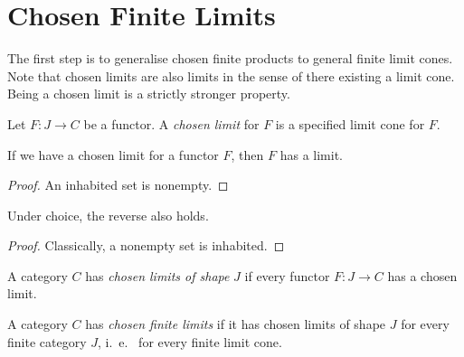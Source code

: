 \section{Chosen Finite Limits}

The first step is to generalise chosen finite products to general finite limit cones. Note that chosen limits are also limits in the sense of there existing a limit cone. Being a chosen limit is a strictly stronger property.

\begin{definition}
  \label{def:chosen-limit}
  \leanok
  Let $F : J \to C$ be a functor. A \emph{chosen limit} for $F$ is a specified limit cone for $F$.
\end{definition}

\begin{proposition}
  \label{prop:chosen-limit-implies-limit}
  \leanok
  If we have a chosen limit for a functor $F$, then $F$ has a limit.
\end{proposition}

\begin{proof}
  \leanok
  An inhabited set is nonempty.
\end{proof}

Under choice, the reverse also holds. 

\begin{proposition}
  \label{prop:limit-implies-chosen-limit}
  \leanok
\end{proposition}

\begin{proof}
  \leanok
  Classically, a nonempty set is inhabited.
\end{proof}

\begin{definition}
  \label{def:chosen-limits-of-shape}
  \leanok
  A category $C$ has \emph{chosen limits of shape} $J$ if every functor $F : J \to C$ has a chosen limit.
\end{definition}

\begin{definition}
  \label{def:chosen-finite-limits}
  \leanok
  A category $C$ has \emph{chosen finite limits} if it has chosen limits of shape $J$ for every finite category $J$, i.~e.~ for every finite limit cone.
\end{definition}


